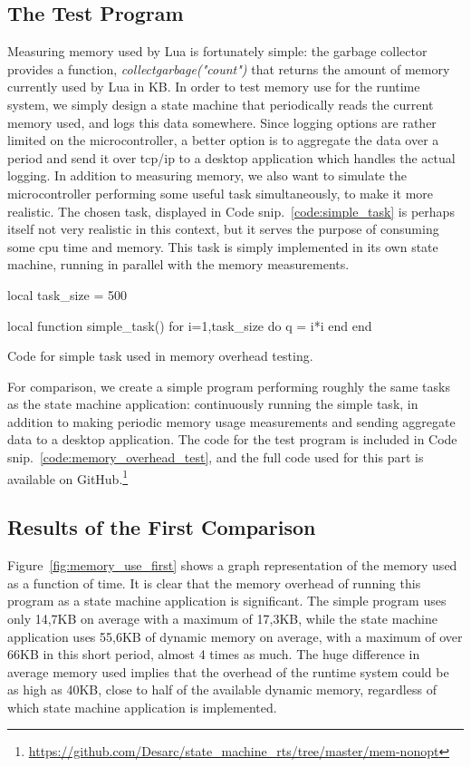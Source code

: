 \subsection{The Test Program}
\label{sec:test_program}
Measuring memory used by Lua is fortunately simple: the garbage collector provides a function, \emph{collectgarbage("count")} that returns the amount of memory currently used by Lua in KB. In order to test memory use for the runtime system, we simply design a state machine that periodically reads the current memory used, and logs this data somewhere. Since logging options are rather limited on the microcontroller, a better option is to aggregate the data over a period and send it over \gls{tcp}/\gls{ip} to a desktop application which handles the actual logging. In addition to measuring memory, we also want to simulate the microcontroller performing some useful task simultaneously, to make it more realistic. The chosen task, displayed in Code snip.~\ref{code:simple_task} is perhaps itself not very realistic in this context, but it serves the purpose of consuming some \gls{cpu} time and memory. This task is simply implemented in its own state machine, running in parallel with the memory measurements.

\begin{listing}[htp]
\begin{luacode}
local task_size = 500

local function simple_task()
	for i=1,task_size do
		q = i*i
	end
end
\end{luacode}
	\caption{Code for simple task used in memory overhead testing.}
	\label{code:simple_task}
\end{listing}

\noindent
For comparison, we create a simple program performing roughly the same tasks as the state machine application: continuously running the simple task, in addition to making periodic memory usage measurements and sending aggregate data to a desktop application. The code for the test program is included in Code snip.~\ref{code:memory_overhead_test}, and the full code used for this part is available on GitHub.\footnote{\url{https://github.com/Desarc/state_machine_rts/tree/master/mem-nonopt}}

\subsection{Results of the First Comparison}
\label{sec:first_comparison}
Figure~\ref{fig:memory_use_first} shows a graph representation of the memory used as a function of time. It is clear that the memory overhead of running this program as a state machine application is significant. The simple program uses only 14,7KB on average with a maximum of 17,3KB, while the state machine application uses 55,6KB of dynamic memory on average, with a maximum of over 66KB in this short period, almost 4 times as much. The huge difference in average memory used implies that the overhead of the runtime system could be as high as 40KB, close to half of the available dynamic memory, regardless of which state machine application is implemented.

